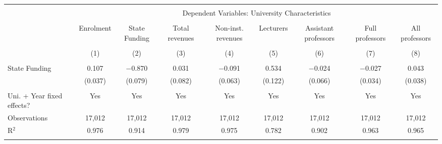 
\begin{tabular}{@{\extracolsep{5pt}}lcccccccc} 
\\[-1.8ex]\hline 
\hline \\[-1.8ex] 
 & \multicolumn{8}{c}{Dependent Variables: University Characteristics} \\ 
\cline{2-9} 
\\[-1.8ex] & Enrolment & State Funding & Total revenues & Non-inst. revenues & Lecturers & Assistant professors & Full professors & All professors \\ 
\\[-1.8ex] & (1) & (2) & (3) & (4) & (5) & (6) & (7) & (8)\\ 
\hline \\[-1.8ex] 
 State Funding & 0.107 & $-$0.870 & 0.031 & $-$0.091 & 0.534 & $-$0.024 & $-$0.027 & 0.043 \\ 
  & (0.037) & (0.079) & (0.082) & (0.063) & (0.122) & (0.066) & (0.034) & (0.038) \\ 
 \hline \\[-1.8ex] 
Uni. + Year fixed effects? & Yes & Yes & Yes & Yes & Yes & Yes & Yes & Yes \\ 
Observations & 17,012 & 17,012 & 17,012 & 17,012 & 17,012 & 17,012 & 17,012 & 17,012 \\ 
R$^{2}$ & 0.976 & 0.914 & 0.979 & 0.975 & 0.782 & 0.902 & 0.963 & 0.965 \\ 
\hline 
\hline \\[-1.8ex] 
\end{tabular} 
